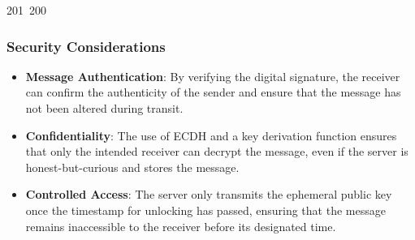 201~200~\documentclass{article}
\begin{document}
	                                                                                                                                                                                                                                                                                                	                                                                                                \subsubsection{Security Considerations}
	                                                                                                                                                                                                                                                                                                	                                                                                                \begin{itemize}
	                                                                                                                                                                                                                                                                                                	                                                                                                    \item \textbf{Message Authentication}: By verifying the digital signature, the receiver can confirm the authenticity of the sender and ensure that the message has not been altered during transit.
	                                                                                                                                                                                                                                                                                                	                                                                                                        \item \textbf{Confidentiality}: The use of ECDH and a key derivation function ensures that only the intended receiver can decrypt the message, even if the server is honest-but-curious and stores the message.
	                                                                                                                                                                                                                                                                                                	                                                                                                            \item \textbf{Controlled Access}: The server only transmits the ephemeral public key once the timestamp for unlocking has passed, ensuring that the message remains inaccessible to the receiver before its designated time.

\end{itemize}
\end{document}
